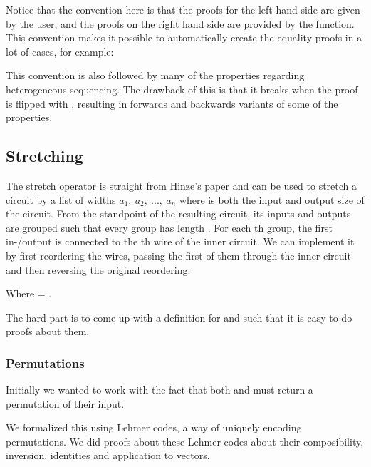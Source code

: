 
Notice that the convention here is that the proofs for the left hand
side are given by the user, and the proofs on the right hand side are
provided by the function.
This convention makes it possible to automatically create the equality
proofs in a lot of cases, for example:


This convention is also followed by many of the properties regarding
heterogeneous sequencing.
The drawback of this is that it breaks when the proof is flipped with
, resulting in forwards and backwards variants of some of
the properties.

\subsection{Stretching}\label{stretching}

The stretch operator  is straight from Hinze's paper and can
be used to stretch a circuit by a list of widths $a_1,\ a_2,\ ...,\
a_n$ where  is both the input and output size of the circuit.
From the standpoint of the resulting circuit, its inputs and outputs
are grouped such that every group  has length \AB{aᵢ}.
For each \AB{i}th group, the first in-/output is connected to the
\AF{i}th wire of the inner circuit.
We can implement it by first reordering the wires, passing the first
\AF{n} of them through the inner circuit and then reversing the
original reordering:


Where    =  \AY{(}  \AY{(}
\AF{\_+\_} \AB{m} \AY{)} \AB{as} \AY{)}.

The hard part is to come up with a definition for  and
 such that it is easy to do proofs about them.

\subsubsection{Permutations}\label{permutations}

Initially we wanted to work with the fact that both  
 and \AF{⟦} \AF{out-⤨} \AF{⟧} must return a permutation of their
input.

We formalized this using Lehmer codes, a way of uniquely encoding
permutations.
We did proofs about these Lehmer codes about their composibility,
inversion, identities and application to vectors.

